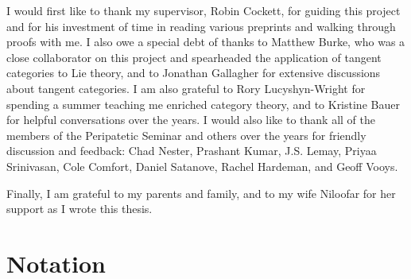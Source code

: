 I would first like to thank my supervisor, Robin Cockett, for guiding this project and for his investment of time in reading various preprints and walking through proofs with me. I also owe a special debt of thanks to Matthew Burke, who was a close collaborator on this project and spearheaded the application of tangent categories to Lie theory, and to Jonathan Gallagher for extensive discussions about tangent categories. I am also grateful to Rory Lucyshyn-Wright for spending a summer teaching me enriched category theory, and to Kristine Bauer for helpful conversations over the years. I would also like to thank all of the members of the Peripatetic Seminar and others over the years for friendly discussion and feedback: Chad Nester, Prashant Kumar, J.S. Lemay, Priyaa Srinivasan, Cole Comfort, Daniel Satanove, Rachel Hardeman, and Geoff Vooys. %

Finally, I am grateful to my parents and family, and to my wife Niloofar for her support as I wrote this thesis.

\dedication{For my wife, Niloofar.}

\chapter{Notation}\label{ch:notation}

